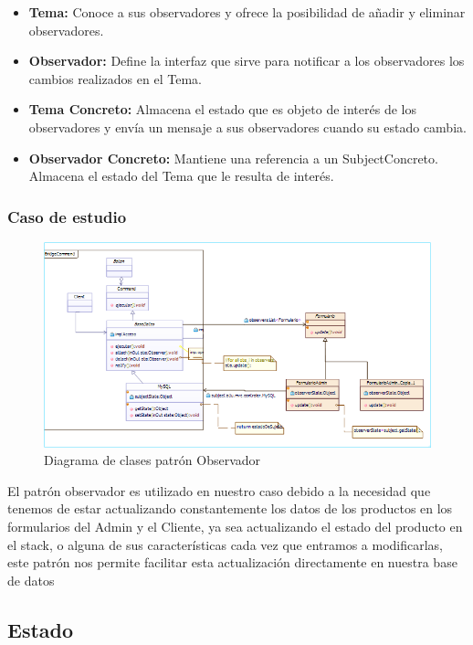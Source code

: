 \begin{itemize}
	\item \textbf{Tema: }Conoce a sus observadores y ofrece la posibilidad de añadir y eliminar observadores.
	\item \textbf{Observador: }Define la interfaz que sirve para notificar a los observadores los cambios realizados en el Tema.
	\item \textbf{Tema Concreto: }Almacena el estado que es objeto de interés de los observadores y envía un mensaje a sus observadores cuando su estado cambia.
	\item \textbf{Observador Concreto: }Mantiene una referencia a un SubjectConcreto. Almacena el estado del Tema que le resulta de interés.
\end{itemize}



\subsubsection{Caso de estudio}
	\begin{figure}[h!]
	\centering
	\includegraphics[width=1.0\linewidth]{arquitectura/imagenes/DiagramaObservador}
	\caption{Diagrama de clases patrón Observador}
\end{figure}



El patrón observador es utilizado en nuestro caso debido a la necesidad que tenemos de estar actualizando constantemente los datos de los productos en los formularios del Admin y el Cliente, ya sea actualizando el estado del producto en el stack, o alguna de sus características cada vez que entramos a modificarlas, este patrón nos permite facilitar esta actualización directamente en nuestra base de datos



\subsection{Estado}
